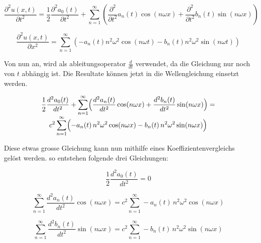 \begin{equation}
	\frac{\partial^2 u(x,t)}{\partial t^2} = \frac{1}{2} \frac{\partial^2 a_0(t)}{\partial t^2} +  \sum_{n=1}^{\infty} \left( \frac{\partial^2}{\partial t^2} a_n(t) \cos(n \omega x) + \frac{\partial^2}{\partial t^2} b_n(t) \sin(n \omega x) \right)
\end{equation}

\begin{equation}
	\frac{\partial^2 u(x,t)}{\partial x^2} = \sum_{n=1}^{\infty} \left( -a_n(t) n^2 \omega^2 \cos(n \omega t) - b_n(t) n^2 \omega^2 \sin(n \omega t) \right)
\end{equation}


Von nun an, wird als ableitungsoperator $\frac{d}{dt}$ verwendet, da die Gleichung nur noch von $t$ abhängig ist.
Die Resultate können jetzt in die Wellengleichung einsetzt werden. 



\begin{multline}
	\frac{1}{2}\frac{d^2 a_0(t)}{dt^2}
	+ \sum_{n=1}^{\infty}\Bigl(
	\frac{d^2 a_n(t)}{dt^2}\cos(n\omega x)
	+ \frac{d^2 b_n(t)}{dt^2}\sin(n\omega x)
	\Bigr)
	= \\[-0.8ex]
	c^2 \sum_{n=1}^{\infty}\Bigl(
	-a_n(t)\,n^2\omega^2\cos(n\omega x)
	-b_n(t)\,n^2\omega^2\sin(n\omega x)
	\Bigr)
\end{multline}


Diese etwas grosse Gleichung kann nun mithilfe eines Koeffizientenvergleichs gelöst werden. so entstehen folgende drei Gleichungen:

\begin{equation}
	\frac{1}{2} \frac{d^2 a_0(t)}{d t^2} = 0
\end{equation}

\begin{equation}
	\sum_{n=1}^{\infty}
	\frac{d^2 a_n(t)}{dt^2}\cos(n\omega x)
	 = c^2 \sum_{n=1}^{\infty}
	-a_n(t)\,n^2\omega^2\cos(n\omega x)
	\end{equation}

\begin{equation}
	\sum_{n=1}^{\infty}
	\frac{d^2 b_n(t)}{dt^2}\sin(n\omega x) = c^2 \sum_{n=1}^{\infty}
	-b_n(t)\,n^2\omega^2\sin(n\omega x)
\end{equation}

